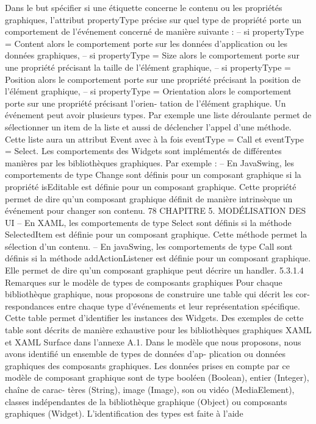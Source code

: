 \documentclass{article}
\begin{document}
Dans le but spéciﬁer si une étiquette concerne le contenu ou les propriétés graphiques, l’attribut
propertyType précise sur quel type de propriété porte un comportement de l’événement concerné de
manière suivante :
– si propertyType = Content alors le comportement porte sur les données d’application ou les
données graphiques,
– si propertyType = Size alors le comportement porte sur une propriété précisant la taille de
l’élément graphique,
– si propertyType = Position alors le comportement porte sur une propriété précisant la position
de l’élément graphique,
– si propertyType = Orientation alors le comportement porte sur une propriété précisant l’orien-
tation de l’élément graphique.
Un événement peut avoir plusieurs types. Par exemple une liste déroulante permet de sélectionner
un item de la liste et aussi de déclencher l’appel d’une méthode. Cette liste aura un attribut Event avec
à la fois eventType = Call et eventType = Select.
Les comportements des Widgets sont implémentés de différentes manières par les bibliothèques
graphiques. Par exemple :
– En JavaSwing, les comportements de type Change sont déﬁnis pour un composant graphique
si la propriété isEditable est déﬁnie pour un composant graphique. Cette propriété permet de
dire qu’un composant graphique déﬁnit de manière intrinsèque un événement pour changer son
contenu.
78
CHAPITRE 5. MODÉLISATION DES UI
– En XAML, les comportements de type Select sont déﬁnis si la méthode SelectedItem est déﬁnie
pour un composant graphique. Cette méthode permet la sélection d’un contenu.
– En javaSwing, les comportements de type Call sont déﬁnis si la méthode addActionListener
est déﬁnie pour un composant graphique. Elle permet de dire qu’un composant graphique peut
décrire un handler.
5.3.1.4
Remarques sur le modèle de types de composants graphiques
Pour chaque bibliothèque graphique, nous proposons de construire une table qui décrit les cor-
respondances entre chaque type d’événements et leur représentation spéciﬁque. Cette table permet
d’identiﬁer les instances des Widgets. Des exemples de cette table sont décrits de manière exhaustive
pour les bibliothèques graphiques XAML et XAML Surface dans l’annexe A.1.
Dans le modèle que nous proposons, nous avons identiﬁé un ensemble de types de données d’ap-
plication ou données graphiques des composants graphiques. Les données prises en compte par ce
modèle de composant graphique sont de type booléen (Boolean), entier (Integer), chaîne de carac-
tères (String), image (Image), son ou vidéo (MediaElement), classes indépendantes de la bibliothèque
graphique (Object) ou composants graphiques (Widget). L’identiﬁcation des types est faite à l’aide
\end{document}
